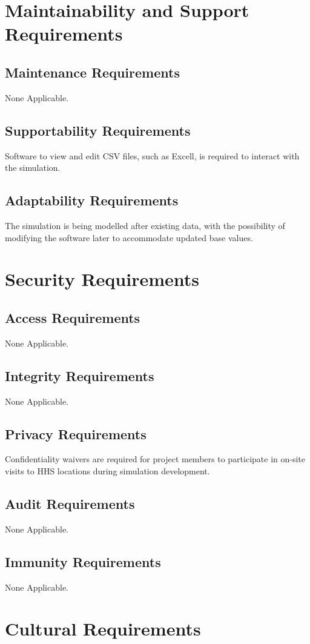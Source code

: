 \documentclass[paper=letter, fontsize=10pt]{scrartcl}
\numberwithin{equation}{section}		%
\numberwithin{figure}{section}			%
\numberwithin{table}{section}				%
\begin{document}
\section{Maintainability and Support Requirements}
\subsection{Maintenance Requirements}
None Applicable.
\subsection{Supportability Requirements}
Software to view and edit CSV files, such as Excell, is required to interact with the simulation.
\subsection{Adaptability Requirements}
The simulation is being modelled after existing data, with the possibility of modifying the software later to accommodate updated base values. 

\section{Security Requirements}
\subsection{Access Requirements}
None Applicable.
\subsection{Integrity Requirements}
None Applicable.
\subsection{Privacy Requirements}
Confidentiality waivers are required for project members to participate in on-site visits to HHS locations during simulation development.
\subsection{Audit Requirements}
None Applicable.
\subsection{Immunity Requirements}
None Applicable.

\section{Cultural Requirements}
\end{document}
